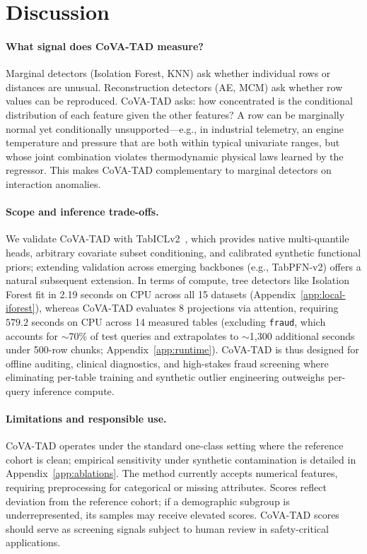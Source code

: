 \documentclass{article}
\begin{document}
\section{Discussion}
\label{sec:discussion}

\paragraph{What signal does CoVA-TAD measure?}
Marginal detectors (Isolation Forest, KNN) ask whether individual rows or distances are unusual. Reconstruction detectors (AE, MCM) ask whether row values can be reproduced. CoVA-TAD asks: how concentrated is the conditional distribution of each feature given the other features? A row can be marginally normal yet conditionally unsupported---e.g., in industrial telemetry, an engine temperature and pressure that are both within typical univariate ranges, but whose joint combination violates thermodynamic physical laws learned by the regressor. This makes CoVA-TAD complementary to marginal detectors on interaction anomalies.

\paragraph{Scope and inference trade-offs.}
We validate CoVA-TAD with TabICLv2~\citep{qu2026tabiclv2}, which provides native multi-quantile heads, arbitrary covariate subset conditioning, and calibrated synthetic functional priors; extending validation across emerging backbones (e.g., TabPFN-v2) offers a natural subsequent extension. In terms of compute, tree detectors like Isolation Forest fit in 2.19 seconds on CPU across all 15 datasets (Appendix~\ref{app:local-iforest}), whereas CoVA-TAD evaluates 8 projections via attention, requiring $579.2$ seconds on CPU across 14 measured tables (excluding \texttt{fraud}, which accounts for $\sim$70\% of test queries and extrapolates to $\sim$1{,}300 additional seconds under 500-row chunks; Appendix~\ref{app:runtime}). CoVA-TAD is thus designed for offline auditing, clinical diagnostics, and high-stakes fraud screening where eliminating per-table training and synthetic outlier engineering outweighs per-query inference compute.

\paragraph{Limitations and responsible use.}
CoVA-TAD operates under the standard one-class setting where the reference cohort is clean; empirical sensitivity under synthetic contamination is detailed in Appendix~\ref{app:ablations}. The method currently accepts numerical features, requiring preprocessing for categorical or missing attributes. Scores reflect deviation from the reference cohort; if a demographic subgroup is underrepresented, its samples may receive elevated scores. CoVA-TAD scores should serve as screening signals subject to human review in safety-critical applications.
\end{document}
